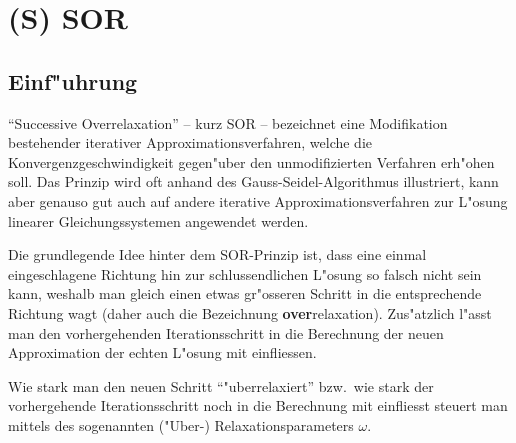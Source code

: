 \chapter{(S) SOR\label{chapter:sor}}
\begin{refsection}

\section{Einf"uhrung}
``Successive Overrelaxation'' -- kurz SOR -- bezeichnet eine
Modifikation bestehender iterativer Approximationsverfahren, welche
die Konvergenzgeschwindigkeit gegen"uber den unmodifizierten Verfahren
erh"ohen soll. Das Prinzip wird oft anhand des Gauss-Seidel-Algorithmus
illustriert, kann aber genauso gut auch auf andere iterative
Approximationsverfahren zur L"osung linearer Gleichungssystemen angewendet
werden.

Die grundlegende Idee hinter dem SOR-Prinzip ist, dass eine einmal
eingeschlagene Richtung hin zur schlussendlichen L"osung so falsch
nicht sein kann, weshalb man gleich einen etwas gr"osseren Schritt
in die entsprechende Richtung wagt (daher auch die Bezeichnung
\textbf{over}relaxation). Zus"atzlich l"asst man den vorhergehenden
Iterationsschritt in die Berechnung der neuen Approximation der echten
L"osung mit einfliessen.

Wie stark man den neuen Schritt ``"uberrelaxiert'' bzw.~wie stark der
vorhergehende Iterationsschritt noch in die Berechnung mit einfliesst
steuert man mittels des sogenannten ("Uber-) Relaxationsparameters
$\omega$.
	

\end{refsection}

